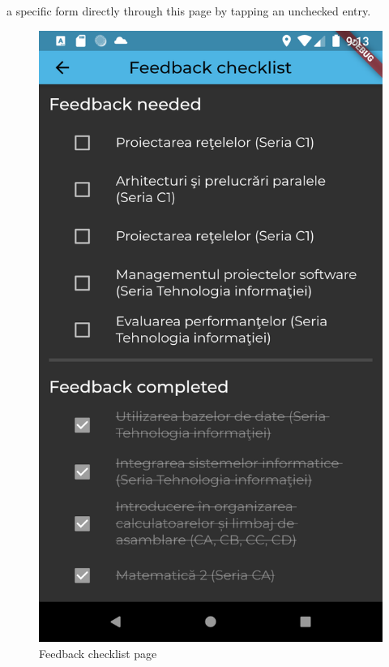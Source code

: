     a specific form directly through this page by tapping an unchecked entry.
    
    \begin{figure}[!ht]
        \centering
        \begin{minipage}[t]{0.32\textwidth}
            \captionsetup{justification=centering}
            \includegraphics[width=\textwidth]{figures/app/final/feedback_checklist.png}
            \caption{Feedback checklist page}
            \label{4:fig:feedback_checklist}

\end{minipage}
\end{figure}
